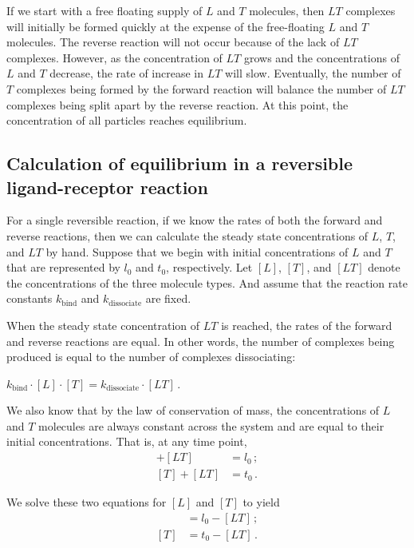 If we start with a free floating supply of $L$ and $T$ molecules, then $LT$ complexes will initially be formed quickly at the expense of the free-floating $L$ and $T$ molecules. The reverse reaction will not occur because of the lack of $LT$ complexes. However, as the concentration of $LT$ grows and the concentrations of $L$ and $T$ decrease, the rate of increase in $LT$ will slow. Eventually, the number of $T$ complexes being formed by the forward reaction will balance the number of $LT$ complexes being split apart by the reverse reaction. At this point, the concentration of all particles reaches equilibrium.

\FloatBarrier
{}
\subsection{Calculation of equilibrium in a reversible ligand-receptor reaction}

For a single reversible reaction, if we know the rates of both the forward and reverse reactions, then we can calculate the steady state concentrations of $L$, $T$, and $LT$ by hand.  Suppose that we begin with initial concentrations of $L$ and $T$ that are represented by $l_0$ and $t_0$, respectively. Let $[L]$, $[T]$, and $[LT]$ denote the concentrations of the three molecule types. And assume that the reaction rate constants $k_\text{bind}$ and $k_\text{dissociate}$ are fixed.

When the steady state concentration of $LT$ is reached, the rates of the forward and reverse reactions are equal. In other words, the number of complexes being produced is equal to the number of complexes dissociating:

\begin{center}
$k_\text{bind} \cdot [L] \cdot [T] = k_\text{dissociate} \cdot [LT] $\,.

\end{center}

We also know that by the law of conservation of mass, the concentrations of $L$ and $T$ molecules are always constant across the system and are equal to their initial concentrations. That is, at any time point,
\begin{align*}
[L] + [LT] & = l_0\,;\\
[T] + [LT] & = t_0\,.
\end{align*}

\noindent We solve these two equations for $[L]$ and $[T]$ to yield
\begin{align*}
[L] & = l_0 - [LT]\,;\\
[T] & = t_0 - [LT]\,.
\end{align*}

